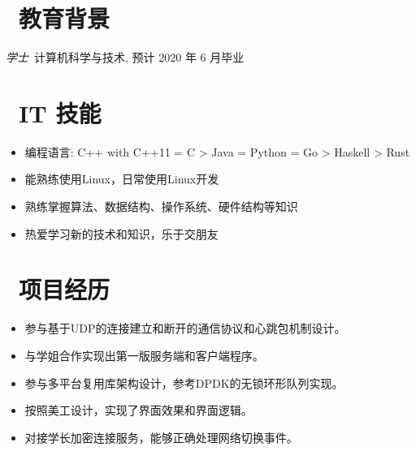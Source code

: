 \documentclass{resume}
\begin{document}



\section{\texorpdfstring{\faGraduationCap\ 教育背景}{教育背景}}
\textit{学士}\ 计算机科学与技术, 预计 2020 年 6 月毕业

\section{\texorpdfstring{\faCogs\ IT 技能}{IT 技能}}
\begin{itemize}[parsep=0.5ex]
  \item 编程语言: C++ with C++11 = C > Java = Python = Go > Haskell > Rust
  \item 能熟练使用Linux，日常使用Linux开发
  \item 熟练掌握算法、数据结构、操作系统、硬件结构等知识
  \item 热爱学习新的技术和知识，乐于交朋友
\end{itemize}

\section{\texorpdfstring{\faUsers\ 项目经历}{项目经历}}
\begin{itemize}
  \item 参与基于UDP的连接建立和断开的通信协议和心跳包机制设计。
  \item 与学姐合作实现出第一版服务端和客户端程序。
  \item 参与多平台复用库架构设计，参考DPDK的无锁环形队列实现。
\end{itemize}

\begin{itemize}
  \item 按照美工设计，实现了界面效果和界面逻辑。
  \item 对接学长加密连接服务，能够正确处理网络切换事件。
\end{itemize}
\end{document}
